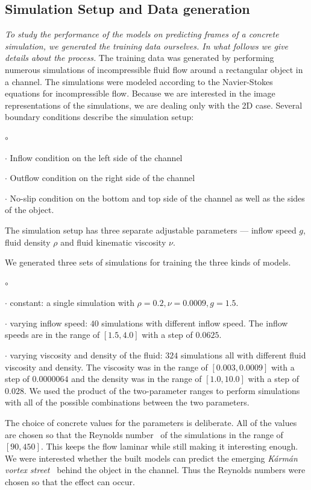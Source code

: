 \documentclass{llncs}
\begin{document}
\subsection{Simulation Setup and Data generation}
\emph{To study the performance of the models on predicting frames of a concrete simulation, we generated the training data ourselves. In what follows we give details about the process.} The training data was generated by performing numerous simulations of incompressible fluid flow around a rectangular object in a channel. The simulations were modeled according to the Navier-Stokes equations for incompressible flow. Because we are interested in the image representations of the simulations, we are dealing only with the 2D case. Several boundary conditions describe the simulation setup:
\begin{list}{$\circ$}{}
\item[$\cdot$] Inflow condition on the left side of the channel
\item[$\cdot$] Outflow condition on the right side of the channel
\item[$\cdot$] No-slip condition on the bottom and top side of the channel as well as the sides of the object.
\end{list}
The simulation setup has three separate adjustable parameters --- inflow speed $g$, fluid density $\rho$ and fluid kinematic viscosity $\nu$.

We generated three sets of simulations for training the three kinds of models.
\begin{list}{$\circ$}{}
\item[$\cdot$] constant: a single simulation with $\rho=0.2, \nu=0.0009, g=1.5$.
\item[$\cdot$] varying inflow speed: $40$ simulations with different inflow speed. The inflow speeds are in the range of $[1.5,4.0]$ with a step of $0.0625$.
\item[$\cdot$] varying viscosity and density of the fluid: $324$ simulations all with different fluid viscosity and density. The viscosity was in the range of $[0.003, 0.0009]$ with a step of $0.0000064$ and the density was in the range of $[1.0, 10.0]$ with a step of $0.028$. We used the product of the two-parameter ranges to perform simulations with all of the possible combinations between the two parameters.
\end{list}

The choice of concrete values for the parameters is deliberate. All of the values are chosen so that the Reynolds number~\cite{trinh2010critical} of the simulations in the range of $[90, 450]$. This keeps the flow laminar while still making it interesting enough. We were interested whether the built models can predict the emerging \emph{Kármán vortex street}~\cite{karaman1911} behind the object in the channel. Thus the Reynolds numbers were chosen so that the effect can occur.
\end{document}

